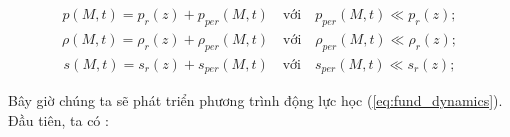 \documentclass[DONG_HOC_KHI_QUYEN.tex]{subfiles}
\begin{document}
\begin{equation}
	\begin{aligned}
		p(M,t)=p_r(z)+p_{per}(M,t)\quad\text{với}\quad p_{per}(M,t)\ll p_r(z);
	\end{aligned}
\end{equation}
\begin{equation}
	\begin{aligned}
		\rho(M,t)=\rho_r(z)+\rho_{per}(M,t)\quad\text{với}\quad \rho_{per}(M,t)\ll \rho_r(z);
	\end{aligned}
\end{equation}
\begin{equation}
	\begin{aligned}
		s(M,t)=s_r(z)+s_{per}(M,t)\quad\text{với}\quad s_{per}(M,t)\ll s_r(z);
	\end{aligned}
\end{equation}

Bây giờ chúng ta sẽ phát triển phương trình động lực học (\ref{eq:fund_dynamics}). Đầu tiên, ta có :
\end{document}
